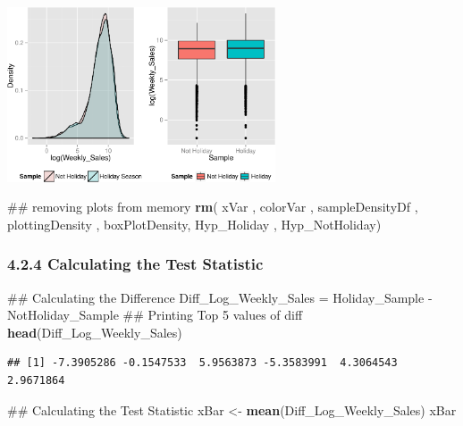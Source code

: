 \documentclass[]{article}
\newenvironment{Shaded}{\begin{snugshade}}{\end{snugshade}}
\newcommand{\KeywordTok}[1]{\textcolor[rgb]{0.13,0.29,0.53}{\textbf{{#1}}}}
\newcommand{\StringTok}[1]{\textcolor[rgb]{0.31,0.60,0.02}{{#1}}}
\newcommand{\NormalTok}[1]{{#1}}
\begin{document}
\includegraphics[width=300px]{PredictingWeeklySalesAtWalmart_files/figure-latex/visualizingTheSamplesCollected2-1}

\begin{Shaded}
\begin{Highlighting}[]
\NormalTok{## removing plots from memory}
\KeywordTok{rm}\NormalTok{( xVar , colorVar , sampleDensityDf , plottingDensity , }
    \NormalTok{boxPlotDensity, Hyp_Holiday , Hyp_NotHoliday)}
\end{Highlighting}
\end{Shaded}

\subsubsection{4.2.4 Calculating the Test
Statistic}\label{calculating-the-test-statistic-1}

\begin{Shaded}
\begin{Highlighting}[]
\NormalTok{## Calculating the Difference}
\NormalTok{Diff_Log_Weekly_Sales =}\StringTok{ }\NormalTok{Holiday_Sample -}\StringTok{ }\NormalTok{NotHoliday_Sample}
\NormalTok{## Printing Top 5 values of diff}
\KeywordTok{head}\NormalTok{(Diff_Log_Weekly_Sales)}
\end{Highlighting}
\end{Shaded}

\begin{verbatim}
## [1] -7.3905286 -0.1547533  5.9563873 -5.3583991  4.3064543  2.9671864
\end{verbatim}

\begin{Shaded}
\begin{Highlighting}[]
\NormalTok{## Calculating the Test Statistic}
\NormalTok{xBar <-}\StringTok{ }\KeywordTok{mean}\NormalTok{(Diff_Log_Weekly_Sales)}
\NormalTok{xBar}
\end{Highlighting}
\end{Shaded}
\end{document}
